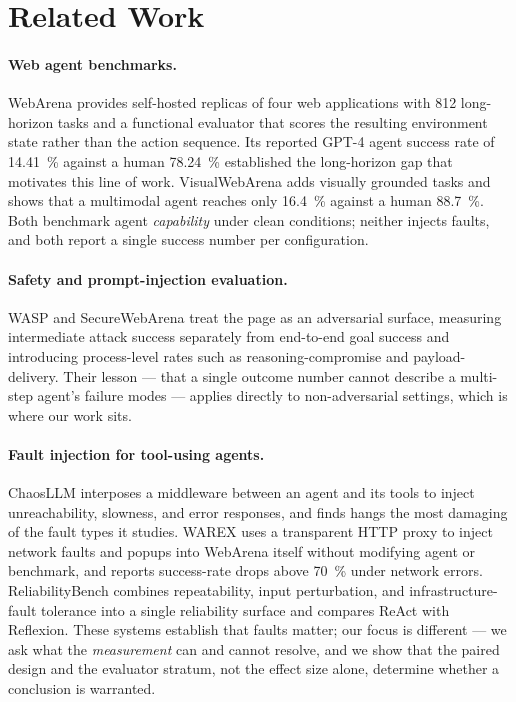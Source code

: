 \section{Related Work}
\label{sec:related}

\paragraph{Web agent benchmarks.}
WebArena \citep{zhou2024webarena} provides self-hosted replicas of four web
applications with \num{812} long-horizon tasks and a functional evaluator that
scores the resulting environment state rather than the action sequence. Its
reported GPT-4 agent success rate of \SI{14.41}{\percent} against a human
\SI{78.24}{\percent} established the long-horizon gap that motivates this line of
work. VisualWebArena \citep{koh2024visualwebarena} adds visually grounded tasks
and shows that a multimodal agent reaches only \SI{16.4}{\percent} against a human
\SI{88.7}{\percent}. Both benchmark agent \emph{capability} under clean
conditions; neither injects faults, and both report a single success number per
configuration.

\paragraph{Safety and prompt-injection evaluation.}
WASP \citep{evtimov2025wasp} and SecureWebArena \citep{levy2025securewebarena}
treat the page as an adversarial surface, measuring intermediate attack success
separately from end-to-end goal success and introducing process-level rates such
as reasoning-compromise and payload-delivery. Their lesson --- that a
single outcome number cannot describe a multi-step agent's failure modes ---
applies directly to non-adversarial settings, which is where our work sits.

\paragraph{Fault injection for tool-using agents.}
ChaosLLM \citep{zhang2024chaosllm} interposes a middleware between an agent and
its tools to inject unreachability, slowness, and error responses, and finds
hangs the most damaging of the fault types it studies. WAREX
\citep{zhang2025warex} uses a transparent HTTP proxy to inject network faults and
popups into WebArena itself without modifying agent or benchmark, and reports
success-rate drops above \SI{70}{\percent} under network errors. ReliabilityBench
\citep{gupta2025reliabilitybench} combines repeatability, input perturbation, and
infrastructure-fault tolerance into a single reliability surface and compares
ReAct with Reflexion. These systems establish that faults matter; our focus is
different --- we ask what the \emph{measurement} can and cannot resolve, and we
show that the paired design and the evaluator stratum, not the effect size alone,
determine whether a conclusion is warranted.

